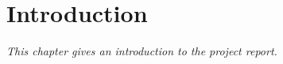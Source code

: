 \chapter{Introduction}\label{C:intro}
\textit{This chapter gives an introduction to the project report.}
